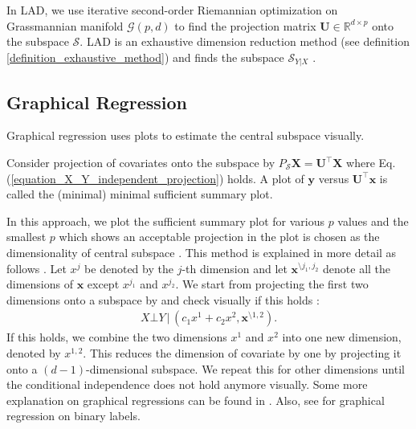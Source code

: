 \documentclass[lang=cn,10pt]{gorgeousnbook}
\numberwithin{equation}{section}%
\numberwithin{figure}{section}%
\begin{document}
In LAD, we use iterative second-order Riemannian optimization \cite{absil2009optimization} on Grassmannian manifold $\mathcal{G}(p,d)$ to find the projection matrix $\boldsymbol{U} \in \mathbb{R}^{d \times p}$ onto the subspace $\mathcal{S}$.
LAD is an exhaustive dimension reduction method (see definition \ref{definition_exhaustive_method}) and finds the subspace $\mathcal{S}_{Y|X}$ \cite{cook2009likelihood}.  

\subsection{Graphical Regression}

Graphical regression \cite{cook1998regression,cook1998regressionPaper} uses plots to estimate the central subspace visually. 

\begin{definition}
Consider projection of covariates onto the subspace by $P_\mathcal{S} \boldsymbol{X} = \boldsymbol{U}^\top \boldsymbol{X}$ where Eq. (\ref{equation_X_Y_independent_projection}) holds. A plot of $\boldsymbol{y}$ versus $\boldsymbol{U}^\top \boldsymbol{x}$ is called the (minimal) minimal sufficient summary plot.
\end{definition}

In this approach, we plot the sufficient summary plot for various $p$ values and the smallest $p$ which shows an acceptable projection in the plot is chosen as the dimensionality of central subspace \cite{cook1998regression}. 
This method is explained in more detail as follows \cite{cook1998regressionPaper}. 
Let $x^j$ be denoted by the $j$-th dimension and let $\boldsymbol{x}^{\setminus j_1, j_2}$ denote all the dimensions of $\boldsymbol{x}$ except $x^{j_1}$ and $x^{j_2}$.
We start from projecting the first two dimensions onto a subspace by and check visually if this holds \cite{cook1998regressionPaper}:
\begin{align*}
X \bot Y\, |\, (c_1 x^1 + c_2 x^2, \boldsymbol{x}^{\setminus 1,2}).
\end{align*}
If this holds, we combine the two dimensions $x^1$ and $x^2$ into one new dimension, denoted by $x^{1,2}$. This reduces the dimension of covariate by one by projecting it onto a $(d-1)$-dimensional subspace. We repeat this for other dimensions until the conditional independence does not hold anymore visually. 
Some more explanation on graphical regressions can be found in \cite{cook1994interpretation,cook2009introduction}.
Also, see \cite{cook1996graphics} for graphical regression on binary labels.
\end{document}
